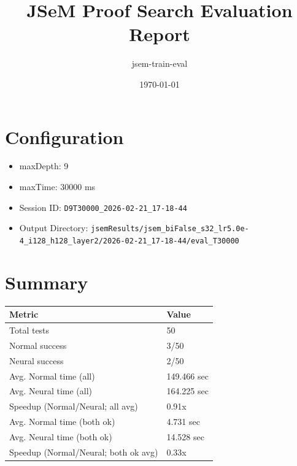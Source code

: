 \documentclass[a4paper,10pt]{article}
\title{JSeM Proof Search Evaluation Report}
\author{jsem-train-eval}
\date{\today}
\begin{document}
\maketitle

\section{Configuration}
\begin{itemize}
\item maxDepth: 9
\item maxTime: 30000 ms
\item Session ID: \texttt{D9T30000\_2026-02-21\_17-18-44}
\item Output Directory: \texttt{jsemResults/jsem\_biFalse\_s32\_lr5.0e-4\_i128\_h128\_layer2/2026-02-21\_17-18-44/eval\_T30000}
\end{itemize}

\section{Summary}
\begin{tabular}{ll}
\toprule
\textbf{Metric} & \textbf{Value} \\
\midrule
Total tests & 50 \\
Normal success & 3/50 \\
Neural success & 2/50 \\
\midrule
Avg. Normal time (all) & 149.466 sec \\
Avg. Neural time (all) & 164.225 sec \\
Speedup (Normal/Neural; all avg) & 0.91x \\
Avg. Normal time (both ok) & 4.731 sec \\
Avg. Neural time (both ok) & 14.528 sec \\
Speedup (Normal/Neural; both ok avg) & 0.33x \\
\bottomrule
\end{tabular}
\end{document}
